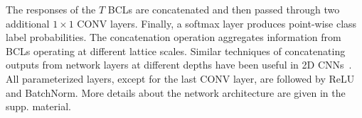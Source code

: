\documentclass[10pt,twocolumn,letterpaper]{article}
\begin{document}
The responses of the $T$ BCLs are concatenated and then passed through two additional $1\times1$ CONV layers. 
Finally, a softmax layer produces point-wise class label probabilities.
The concatenation operation aggregates information from BCLs operating at different lattice scales. 
Similar techniques of concatenating outputs from network layers at different depths
have been useful in 2D CNNs~\cite{hariharan2015hypercolumns}.
All parameterized layers, except for the last CONV layer, are followed by ReLU and BatchNorm.
More details about the network architecture are given in the supp. material.

\end{document}
